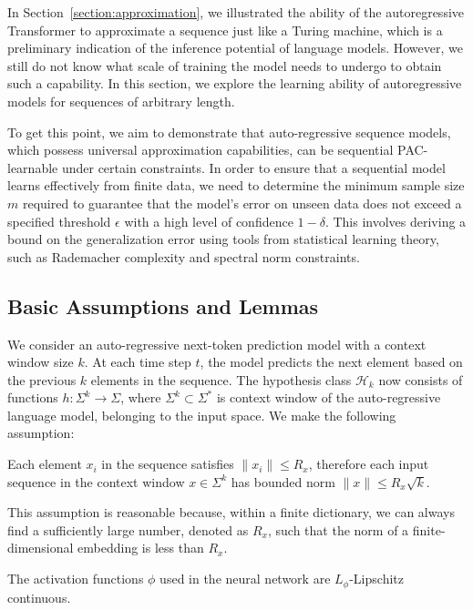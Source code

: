 In Section~\ref{section:approximation}, we illustrated the ability of the autoregressive Transformer to approximate a sequence just like a Turing machine, which is a preliminary indication of the inference potential of language models. However, we still do not know what scale of training the model needs to undergo to obtain such a capability. In this section, we explore the learning ability of autoregressive models for sequences of arbitrary length.


To get this point, we aim to demonstrate that auto-regressive sequence models, which possess universal approximation capabilities, can be sequential PAC-learnable under certain constraints. In order to ensure that a sequential model learns effectively from finite data, we need to determine the minimum sample size \( m \) required to guarantee that the model's error on unseen data does not exceed a specified threshold \( \epsilon \) with a high level of confidence \( 1 - \delta \). This involves deriving a bound on the generalization error using tools from statistical learning theory, such as Rademacher complexity \citep{bartlett2002rademacher} and spectral norm constraints\citep{bartlett2017spectrally}.

\subsection{Basic Assumptions and Lemmas}

We consider an auto-regressive next-token prediction model with a context window size \( k \). At each time step \( t \), the model predicts the next element based on the previous \( k \) elements in the sequence. The hypothesis class \( \mathcal{H}_k \) now consists of functions \( h: \Sigma^k \to \Sigma \), where \( \Sigma^k \subset \Sigma^*\) is context window of the auto-regressive language model, belonging to the input space. We make the following assumption: 

\begin{assumption}
     Each element \( x_i \) in the sequence satisfies \( \| x_i \| \leq R_x \), therefore each input sequence in the context window \( x \in \Sigma^k \) has bounded norm \( \| x \| \leq R_x \sqrt{k} \).
\end{assumption}
This assumption is reasonable because, within a finite dictionary, we can always find a sufficiently large number, denoted as \(R_x\), such that the norm of a finite-dimensional embedding is less than \(R_x\).

\begin{assumption}
    The activation functions \( \phi \) used in the neural network are \( L_{\phi} \)-Lipschitz continuous.
\end{assumption} 

